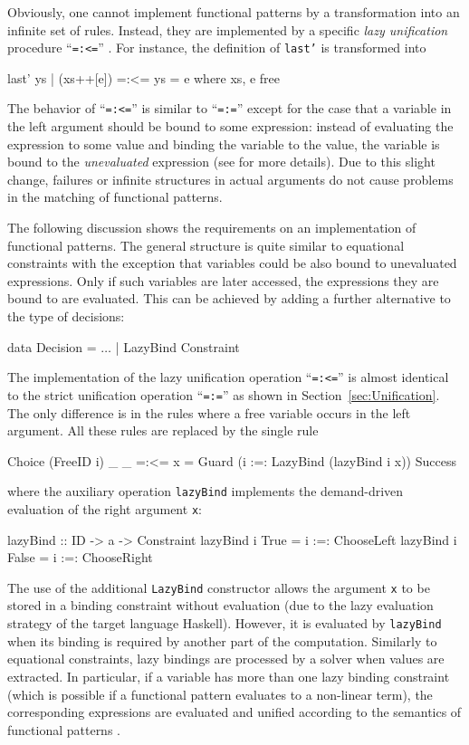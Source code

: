 \documentclass{llncs}
\newcommand{\code}[1]{\mbox{\small\texttt{#1}}}
\newcommand{\ccode}[1]{``\code{#1}''}
\begin{document}
Obviously, one cannot implement functional patterns by
a transformation into an infinite set of rules. Instead, they are
implemented by a specific \emph{lazy unification} procedure \ccode{=:<=}
\cite{AntoyHanus05LOPSTR}.
For instance, the definition of \code{last'} is transformed into
\begin{curry}
  last' ys | (xs++[e]) =:<= ys  = e   where xs, e free
\end{curry}
The behavior of \ccode{=:<=} is similar to \ccode{=:=}
except for the case that a variable in the left argument
should be bound to some expression: instead of evaluating
the expression to some value and binding the variable to the value,
the variable is bound to the \emph{unevaluated} expression
(see \cite{AntoyHanus05LOPSTR} for more details).
Due to this slight change, failures or infinite structures
in actual arguments do not cause problems in the matching
of functional patterns.

The following discussion shows the requirements on an 
implementation of functional patterns.
The general structure
is quite similar to equational constraints
with the exception that variables could be also bound
to unevaluated expressions. Only if such variables are later
accessed, the expressions they are bound to are evaluated.
This can be achieved by adding a further alternative
to the type of decisions:
\begin{haskell}
  data Decision = $\ldots$ | LazyBind Constraint
\end{haskell}
%
The implementation of the lazy unification operation \ccode{=:<=}
is almost identical to the strict unification operation \ccode{=:=}
as shown in Section~\ref{sec:Unification}.
The only difference is in the rules where a free variable occurs
in the left argument. All these rules are replaced by the single
rule
\begin{haskell}
  Choice (FreeID i) _ _ =:<= x
    = Guard (i :=: LazyBind (lazyBind i x)) Success
\end{haskell}
where the auxiliary operation \code{lazyBind}
implements the demand-driven evaluation of the right argument \code{x}:
\begin{haskell}
  lazyBind :: ID -> a -> Constraint
  lazyBind i True  = i :=: ChooseLeft
  lazyBind i False = i :=: ChooseRight
\end{haskell}
The use of the additional \code{LazyBind} constructor allows the argument 
\code{x} to be stored in a binding constraint without evaluation 
(due to the lazy evaluation strategy of the
target language Haskell).
However, it is evaluated by \code{lazyBind} when its binding
is required by another part of the computation.
Similarly to equational constraints,
lazy bindings are processed by a solver when values are extracted.
In particular, if a variable has more than one lazy binding constraint
(which is possible if a functional pattern evaluates to a non-linear term),
the corresponding expressions are evaluated and unified
according to the semantics of functional patterns
\cite{AntoyHanus05LOPSTR}.
\end{document}
